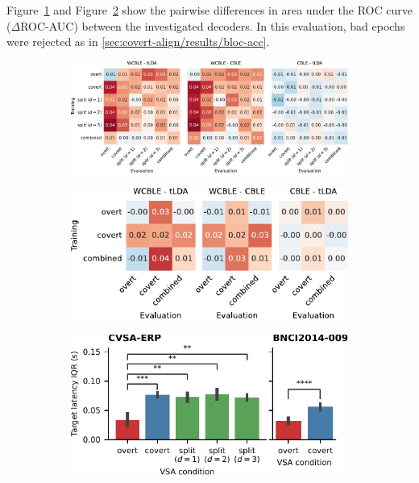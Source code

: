 Figure~\ref{fig:covert-align/covert-cross-eval} and Figure~\ref{fig:covert-align/aloise2012-cross-eval} show
the pairwise differences in area under the ROC curve ($\Delta$ROC-AUC)
between the investigated decoders.
In this evaluation, bad epochs were rejected as in \cref{sec:covert-align/results/bloc-acc}.
\begin{figure}
  \bigskip
	\begin{subfigure}{\linewidth}
		\caption{}
		\label{fig:covert-align/covert-cross-eval}
		\includegraphics[width=\linewidth]{figures/covert_align/figure5a.pdf}
	\end{subfigure}

	\bigskip
	\bigskip

	\begin{subfigure}[c]{.48\linewidth}
		\caption{}
		\label{fig:covert-align/aloise2012-cross-eval}
		\includegraphics[width=\linewidth]{figures/covert_align/figure5b.pdf}
	\end{subfigure}\hfill%
	\begin{subfigure}[c]{.48\linewidth}
		\caption{}
		\label{fig:jitter}
		\includegraphics[width=\linewidth]{figures/covert_align/figure5c.pdf}
	\end{subfigure}


\end{figure}
